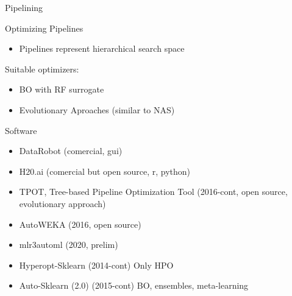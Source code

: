 \begin{frame}{Pipelining}
  
\end{frame}

\begin{frame}{Optimizing Pipelines}
  \begin{itemize}
    \item Pipelines represent hierarchical search space
  \end{itemize}

  Suitable optimizers:
  \begin{itemize}
    \item BO with RF surrogate
    \item Evolutionary Aproaches (similar to NAS)
  \end{itemize}
    
\end{frame}

\begin{frame}{Software}

\begin{itemize}
  \item DataRobot (comercial, gui)
  \item H20.ai (comercial but open source, r, python)
  \item TPOT, Tree-based Pipeline Optimization Tool  (2016-cont, open source, evolutionary approach) %
  \item AutoWEKA (2016, open source)
  \item mlr3automl (2020, prelim)
  \item Hyperopt-Sklearn (2014-cont) Only HPO
  \item Auto-Sklearn (2.0) (2015-cont) BO, ensembles, meta-learning
\end{itemize}

\end{frame}




